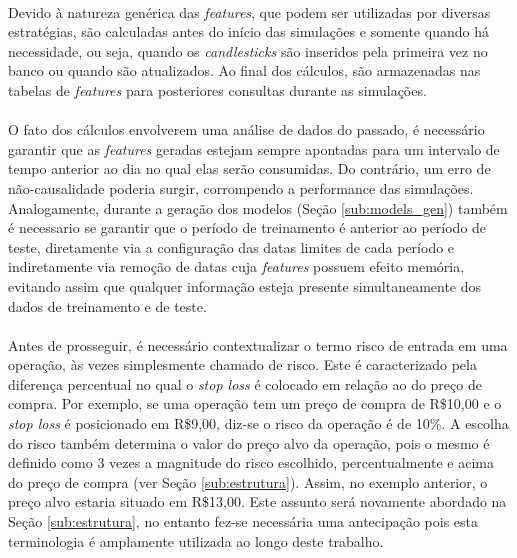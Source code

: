 \paragraph{} Devido à natureza genérica das \textit{features}, que podem ser utilizadas por diversas estratégias, são calculadas antes do início das simulações e somente quando há necessidade, ou seja, quando os \textit{candlesticks} são inseridos pela primeira vez no banco ou quando são atualizados. Ao final dos cálculos, são armazenadas nas tabelas de \textit{features} para posteriores consultas durante as simulações.

\paragraph{} O fato dos cálculos envolverem uma análise de dados do passado, é necessário garantir que as \textit{features} geradas estejam sempre apontadas para um intervalo de tempo anterior ao dia no qual elas serão consumidas. Do contrário, um erro de não-causalidade poderia surgir, corrompendo a performance das simulações. Analogamente, durante a geração dos modelos (Seção \ref{sub:models_gen}) também é necessario se garantir que o período de treinamento é anterior ao período de teste, diretamente via a configuração das datas limites de cada período e indiretamente via remoção de datas cuja \textit{features} possuem efeito memória, evitando assim que qualquer informação esteja presente simultaneamente dos dados de treinamento e de teste.

\paragraph{} Antes de prosseguir, é necessário contextualizar o termo risco de entrada em uma operação, às vezes simplesmente chamado de risco. Este é caracterizado pela diferença percentual no qual o \textit{stop loss} é colocado em relação ao do preço de compra. Por exemplo, se uma operação tem um preço de compra de R\$10,00 e o \textit{stop loss} é posicionado em R\$9,00, diz-se o risco da operação é de 10\%. A escolha do risco também determina o valor do preço alvo da operação, pois o mesmo é definido como 3 vezes a magnitude do risco escolhido, percentualmente e acima do preço de compra (ver Seção \ref{sub:estrutura}). Assim, no exemplo anterior, o preço alvo estaria situado em R\$13,00. Este assunto será novamente abordado na Seção \ref{sub:estrutura}, no entanto fez-se necessária uma antecipação pois esta terminologia é amplamente utilizada ao longo deste trabalho.

